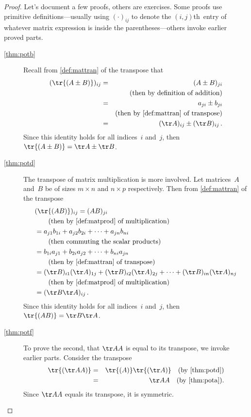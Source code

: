\begin{proof} 
Let's document a few proofs, others are exercises.
Some proofs use primitive definitions---usually using \((\cdot)_{ij}\) to denote the \((i,j)\)th~entry of whatever matrix expression is inside the parentheses---others invoke earlier proved parts.
\begin{description}
\item[\ref{thm:potb}]
Recall from \cref{def:mattran} of the transpose that
\begin{eqnarray*}
(\tr{(A\pm B)})_{ij}
&=&(A\pm B)_{ji}
\\&&(\text{then by definition of addition})
\\&=&a_{ji}\pm b_{ji}
\\&&(\text{then by \cref{def:mattran} of transpose})
\\&=&(\tr A)_{ij}\pm(\tr B)_{ij}\,.
\end{eqnarray*}
Since this identity holds for all indices~\(i\) and~\(j\), then \(\tr{(A\pm B)}=\tr A\pm \tr B\).

\item[\ref{thm:potd}]
The transpose of matrix multiplication is more involved.
Let matrices~\(A\) and~\(B\) be of sizes \(m\times n\) and \(n\times p\) respectively.  Then from \cref{def:mattran} of the transpose
\begin{align*}
&(\tr{(AB)})_{ij}=(AB)_{ji}
\\&\qquad(\text{then by \cref{def:matprod} of multiplication})
\\&=a_{j1}b_{1i}+a_{j2}b_{2i}+\cdots+a_{jn}b_{ni}
\\&\qquad(\text{then commuting the scalar products})
\\&=b_{1i}a_{j1}+b_{2i}a_{j2}+\cdots+b_{ni}a_{jn}
\\&\qquad(\text{then by \cref{def:mattran} of  transpose})
\\&=(\tr B)_{i1}(\tr A)_{1j}+(\tr B)_{i2}(\tr A)_{2j}+\cdots+(\tr B)_{in}(\tr A)_{nj}
\\&\qquad(\text{then by \cref{def:matprod} of multiplication})
\\&=(\tr B\tr A)_{ij}\,.
\end{align*}
Since this identity holds for all indices~\(i\) and~\(j\), then \(\tr{(AB)}=\tr B\tr A\).

\item[\ref{thm:potf}] To prove the second, that \(\tr AA\) is equal to its transpose, we invoke earlier parts.
Consider the transpose 
\begin{eqnarray*}
\tr{(\tr AA)}&=& \tr{(A)}\tr{(\tr A)}\quad(\text{by~\cref{thm:potd}})
\\&=&\tr AA\quad(\text{by~\cref{thm:pota}}).
\end{eqnarray*}
Since \(\tr AA\) equals its transpose, it is symmetric.
\end{description}
\end{proof}








